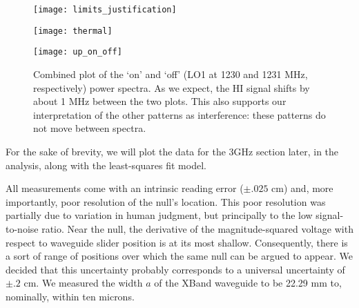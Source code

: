 \documentclass[12pt]{article}
\begin{document}
\begin{figure}
	\centering
	\texttt{[image: limits\_justification]}
	\label{fig:on_limits}
\end{figure}

\begin{figure}
	\centering
	\texttt{[image: thermal]}
	\label{fig:thermal}
\end{figure}

\begin{figure}
	\centering
	\texttt{[image: up\_on\_off]}
	\caption{Combined plot of the `on' and `off' (LO1 at 1230 and 1231 MHz, respectively) power spectra. As we expect, the HI signal shifts by about 1 MHz between the two plots. This also supports our interpretation of the other patterns as interference: these patterns do not move between spectra.}
	\label{fig:up_on_off}
\end{figure}




For the sake of brevity, we will plot the data for the 3GHz section later, in the analysis, along with the least-squares fit model.

All measurements come with an intrinsic reading error ($\pm .025$ cm) and, more importantly, poor resolution of the null's location. This poor resolution was partially due to variation in human judgment, but principally to the low signal-to-noise ratio. Near the null, the derivative of the magnitude-squared voltage with respect to waveguide slider position is at its most shallow. Consequently, there is a sort of range of positions over which the same null can be argued to appear. We decided that this uncertainty probably corresponds to a universal uncertainty of $\pm .2$ cm. We measured the width $a$ of the XBand waveguide to be 22.29 mm to, nominally, within ten microns.
\end{document}
